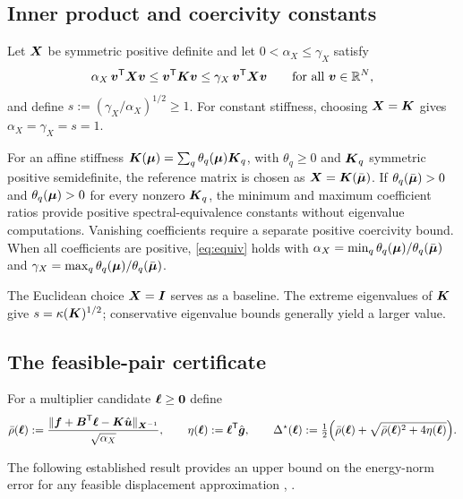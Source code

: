\subsection{Inner product and coercivity constants}
Let $\boldsymbol{X}$ be symmetric positive definite and let $0<\alpha_X\le\gamma_X$ satisfy
\begin{equation}\label{eq:equiv}
  \alpha_X\,\boldsymbol{v}^{\mathsf{T}}\boldsymbol{X}\boldsymbol{v}\le\boldsymbol{v}^{\mathsf{T}}\boldsymbol{K}\boldsymbol{v}\le\gamma_X\,\boldsymbol{v}^{\mathsf{T}}\boldsymbol{X}\boldsymbol{v}\qquad\text{for all }\boldsymbol{v}\in\mathbb R^N,
\end{equation}
and define $s:=(\gamma_X/\alpha_X)^{1/2}\ge1$. For constant stiffness, choosing $\boldsymbol{X}=\boldsymbol{K}$ gives $\alpha_X=\gamma_X=s=1$.

For an affine stiffness $\boldsymbol{K}(\boldsymbol{\mu})=\sum_q\theta_q(\boldsymbol{\mu})\boldsymbol{K}_q$, with $\theta_q\ge0$ and $\boldsymbol{K}_q$ symmetric positive semidefinite, the reference
matrix is chosen as $\boldsymbol{X}=\boldsymbol{K}(\bar{\boldsymbol{\mu}})$. If $\theta_q(\bar{\boldsymbol{\mu}})>0$ and $\theta_q(\boldsymbol{\mu})>0$ for every nonzero $\boldsymbol{K}_q$, the minimum and maximum coefficient ratios
provide positive spectral-equivalence constants without eigenvalue computations. Vanishing coefficients require a separate positive coercivity
bound. When all coefficients are positive, \eqref{eq:equiv} holds with
$\alpha_X=\min_q\theta_q(\boldsymbol{\mu})/\theta_q(\bar{\boldsymbol{\mu}})$ and $\gamma_X=\max_q\theta_q(\boldsymbol{\mu})/\theta_q(\bar{\boldsymbol{\mu}})$.

The Euclidean choice $\boldsymbol{X}=\boldsymbol{I}$ serves as a baseline. The extreme eigenvalues of $\boldsymbol{K}$ give $s=\kappa(\boldsymbol{K})^{1/2}$; conservative eigenvalue
bounds generally yield a larger value.

\subsection{The feasible-pair certificate}
For a multiplier candidate $\boldsymbol{\ell}\ge\boldsymbol 0$ define
\begin{equation}\label{eq:certificate}
  \bar{\rho}(\boldsymbol{\ell}):=\frac{\lVert \boldsymbol{f}+\boldsymbol{B}^{\mathsf{T}}\boldsymbol{\ell}-\boldsymbol{K}\hat{\boldsymbol{u}} \rVert_{\boldsymbol{X}^{-1}}}{\sqrt{\alpha_X}},\qquad
  \eta(\boldsymbol{\ell}):=\boldsymbol{\ell}^{\mathsf{T}}\hat{\boldsymbol{g}},\qquad
  \Delta^{\star}(\boldsymbol{\ell}):=\tfrac12\Big(\bar{\rho}(\boldsymbol{\ell})+\sqrt{\bar{\rho}(\boldsymbol{\ell})^2+4\eta(\boldsymbol{\ell})}\Big).
\end{equation}

The following established result provides an upper bound on the energy-norm error for any feasible displacement approximation
\cite[Prop.~4.3]{zhang2016cr}, \cite[Prop.~3.3.6]{zhang2016thesis}.

